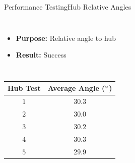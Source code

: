 \begin{frame}{Performance Testing}{Hub Relative Angles}
\begin{columns}
    \begin{itemize}
        \item \textbf{Purpose:} Relative angle to hub
        \item \textbf{Result:} Success
    \end{itemize}
\end{columns}
\vspace{10pt}
\begin{table}[!h]
    \centering
\begin{tabular}{cc}
    \hline
     \rowcolor{beamer@barcolor} Hub Test & Average Angle ($\degree$) \\
     \hline
      $1$ & $30.3$ \\
      \rowcolor{beamer@barcolor} $2$ & $30.0$ \\
      $3$ &  $30.2$ \\
      \rowcolor{beamer@barcolor} $4$ & $30.3$ \\
      $5$ & $29.9$ \\
      \hline
\end{tabular}
\end{table}
\end{frame}



